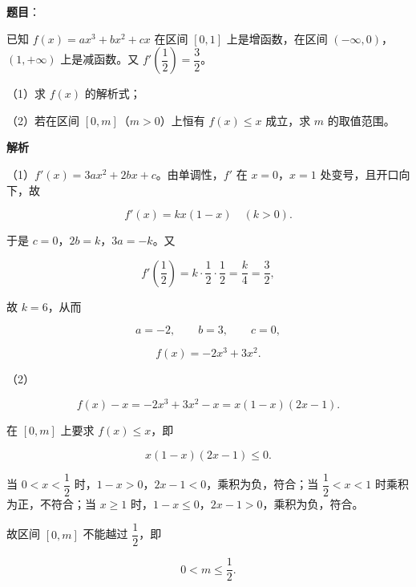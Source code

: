 \begin{answer}

\textbf{题目}：

已知 $f(x)=ax^3+bx^2+cx$ 在区间 $[0,1]$ 上是增函数，在区间 $(-\infty,0)$，$(1,+\infty)$ 上是减函数。又 $f'\left(\dfrac12\right)=\dfrac32$。

（1）求 $f(x)$ 的解析式；

（2）若在区间 $[0,m]$（$m>0$）上恒有 $f(x)\leqslant x$ 成立，求 $m$ 的取值范围。

\textbf{解析}

（1）$f'(x)=3ax^2+2bx+c$。由单调性，$f'$ 在 $x=0$，$x=1$ 处变号，且开口向下，故

\nopagebreak[4]
\[f'(x)=k x(1-x)\quad(k>0).\]

于是 $c=0$，$2b=k$，$3a=-k$。又

\nopagebreak[4]
\[f'\left(\frac12\right)=k\cdot\frac12\cdot\frac12=\frac k4=\frac32,\]

故 $k=6$，从而

\nopagebreak[4]
\[a=-2,\qquad b=3,\qquad c=0,\]

\nopagebreak[4]
\[f(x)=-2x^3+3x^2.\]

（2）

\nopagebreak[4]
\[f(x)-x=-2x^3+3x^2-x=x(1-x)(2x-1).\]

在 $[0,m]$ 上要求 $f(x)\leqslant x$，即

\nopagebreak[4]
\[x(1-x)(2x-1)\leqslant0.\]

当 $0<x<\dfrac12$ 时，$1-x>0$，$2x-1<0$，乘积为负，符合；当 $\dfrac12<x<1$ 时乘积为正，不符合；当 $x\geqslant1$ 时，$1-x\leqslant0$，$2x-1>0$，乘积为负，符合。

故区间 $[0,m]$ 不能越过 $\dfrac12$，即

\nopagebreak[4]
\[0<m\leqslant\frac12.\]


\end{answer}